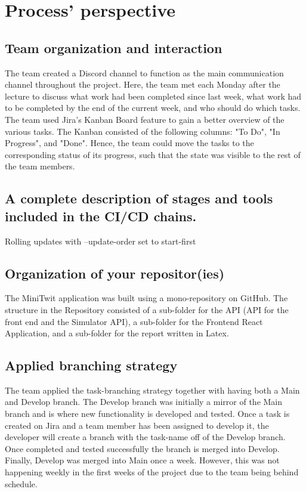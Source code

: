 \section{Process' perspective}

\subsection{Team organization and interaction}
The team created a Discord channel to function as the main communication channel throughout the project. Here, the team met each Monday after the lecture to discuss what work had been completed since last week, what work had to be completed by the end of the current week, and who should do which tasks. \\
The team used Jira's Kanban Board feature\cite{jira} to gain a better overview of the various tasks. The Kanban consisted of the following columns: "To Do", "In Progress", and "Done". Hence, the team could move the tasks to the corresponding status of its progress, such that the state was visible to the rest of the team members.

\subsection{A complete description of stages and tools included in the CI/CD chains.}
Rolling updates with --update-order set to start-first


\subsection{Organization of your repositor(ies)}
The MiniTwit application was built using a mono-repository on GitHub. The structure in the Repository consisted of a sub-folder for the API (API for the front end and the Simulator API), a sub-folder for the Frontend React Application, and a sub-folder for the report written in Latex. 

\subsection{Applied branching strategy}
The team applied the task-branching strategy\cite{branching} together with having both a Main and Develop branch. The Develop branch was initially a mirror of the Main branch and is where new functionality is developed and tested. Once a task is created on Jira and a team member has been assigned to develop it, the developer will create a branch with the task-name off of the Develop branch. Once completed and tested successfully the branch is merged into Develop. Finally, Develop was merged into Main once a week. However, this was not happening weekly in the first weeks of the project due to the team being behind schedule. 

